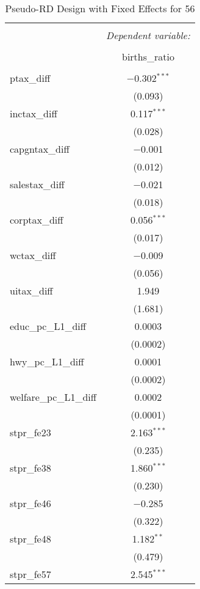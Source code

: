 
\begin{table}[!htbp] \centering 
  \caption{Pseudo-RD Design with Fixed Effects for  56} 
  \label{} 
\begin{tabular}{@{\extracolsep{5pt}}lc} 
\\[-1.8ex]\hline 
\hline \\[-1.8ex] 
 & \multicolumn{1}{c}{\textit{Dependent variable:}} \\ 
\cline{2-2} 
\\[-1.8ex] & births\_ratio \\ 
\hline \\[-1.8ex] 
 ptax\_diff & $-$0.302$^{***}$ \\ 
  & (0.093) \\ 
  inctax\_diff & 0.117$^{***}$ \\ 
  & (0.028) \\ 
  capgntax\_diff & $-$0.001 \\ 
  & (0.012) \\ 
  salestax\_diff & $-$0.021 \\ 
  & (0.018) \\ 
  corptax\_diff & 0.056$^{***}$ \\ 
  & (0.017) \\ 
  wctax\_diff & $-$0.009 \\ 
  & (0.056) \\ 
  uitax\_diff & 1.949 \\ 
  & (1.681) \\ 
  educ\_pc\_L1\_diff & 0.0003 \\ 
  & (0.0002) \\ 
  hwy\_pc\_L1\_diff & 0.0001 \\ 
  & (0.0002) \\ 
  welfare\_pc\_L1\_diff & 0.0002 \\ 
  & (0.0001) \\ 
  stpr\_fe23 & 2.163$^{***}$ \\ 
  & (0.235) \\ 
  stpr\_fe38 & 1.860$^{***}$ \\ 
  & (0.230) \\ 
  stpr\_fe46 & $-$0.285 \\ 
  & (0.322) \\ 
  stpr\_fe48 & 1.182$^{**}$ \\ 
  & (0.479) \\ 
  stpr\_fe57 & 2.545$^{***}$ \\ 

\end{tabular}
\end{table}
